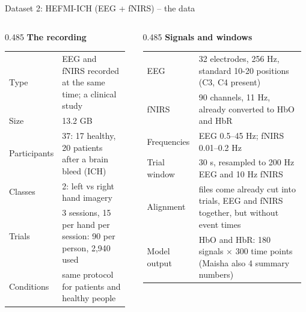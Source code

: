 \documentclass[aspectratio=169,11pt]{beamer}
\newcommand{\colhead}[1]{\textbf{#1}\par\vspace{2pt}}
\begin{document}
\begin{frame}{Dataset 2: HEFMI-ICH (EEG + fNIRS) -- the data}
\begin{slidebox}
\scriptsize
\begin{columns}[T,onlytextwidth]
\begin{column}{0.485\textwidth}
\colhead{\small The recording}
\begin{tabular}{@{}p{0.3\linewidth}p{0.66\linewidth}@{}}
\toprule
Type & EEG and fNIRS recorded at the same time; a clinical study \\
Size & 13.2 GB \\
Participants & 37: 17 healthy, 20 patients after a brain bleed (ICH) \\
Classes & 2: left vs right hand imagery \\
Trials & 3 sessions, 15 per hand per session: 90 per person, 2,940 used \\
Conditions & same protocol for patients and healthy people \\
\bottomrule
\end{tabular}
\end{column}
\begin{column}{0.485\textwidth}
\colhead{\small Signals and windows}
\begin{tabular}{@{}p{0.3\linewidth}p{0.66\linewidth}@{}}
\toprule
EEG & 32 electrodes, 256 Hz, standard 10-20 positions (C3, C4 present) \\
fNIRS & 90 channels, 11 Hz, already converted to HbO and HbR \\
Frequencies & EEG 0.5--45 Hz; fNIRS 0.01--0.2 Hz \\
Trial window & 30 s, resampled to 200 Hz EEG and 10 Hz fNIRS \\
Alignment & files come already cut into trials, EEG and fNIRS together, but without event times \\
Model output & HbO and HbR: 180 signals $\times$ 300 time points (Maisha also 4 summary numbers) \\
\bottomrule
\end{tabular}
\end{column}
\end{columns}
\end{slidebox}
\end{frame}
\end{document}
